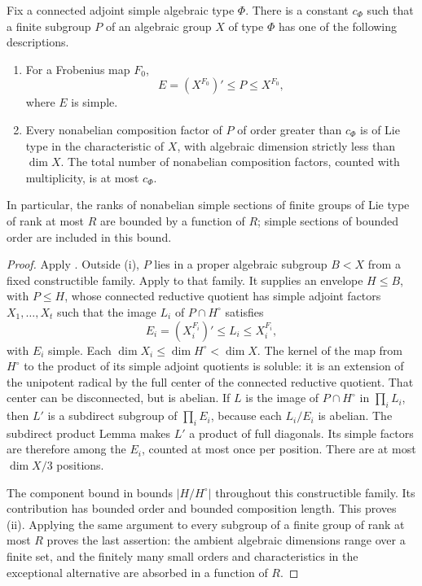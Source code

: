 \begin{lemma}\label{cls:envelopes}
Fix a connected adjoint simple algebraic type $\Phi$.  There is a
constant $c_\Phi$ such that a finite subgroup $P$ of an algebraic
group $X$ of type $\Phi$ has one of the following descriptions.
\begin{enumerate}[label=\textup{(\roman*)}]
\item For a Frobenius map $F_0$,
\[
 E=(X^{F_0})'\leq P\leq X^{F_0},
\]
where $E$ is simple.
\item Every nonabelian composition factor of $P$ of order greater
than $c_\Phi$ is of Lie type in the characteristic of $X$, with
algebraic dimension strictly less than $\dim X$.  The total number
of nonabelian composition factors, counted with multiplicity, is at
most $c_\Phi$.
\end{enumerate}
In particular, the ranks of nonabelian simple sections of finite
groups of Lie type of rank at most $R$ are bounded by a function of
$R$; simple sections of bounded order are included in this bound.
\end{lemma}
\begin{proof}
Apply \cite[Theorem~0.5]{LarsenPink2011}.  Outside (i), $P$ lies in
a proper algebraic subgroup $B<X$ from a fixed constructible family.
Apply \cite[Theorem~12.3]{LarsenPink2011} to that family.  It supplies
an envelope $H\leq B$, with $P\leq H$, whose connected reductive
quotient has simple adjoint factors $X_1,\ldots,X_t$ such that the
image $L_i$ of $P\cap H^\circ$ satisfies
\[
 E_i=(X_i^{F_i})'\leq L_i\leq X_i^{F_i},
\]
with $E_i$ simple.  Each $\dim X_i\leq\dim H^\circ<\dim X$.
The kernel of the map from $H^\circ$ to the product of its simple
adjoint quotients is soluble: it is an extension of the unipotent
radical by the full center of the connected reductive quotient.
That center can be disconnected, but is abelian.  If $L$ is the image of $P\cap H^\circ$
in $\prod_i L_i$, then $L'$ is a subdirect subgroup of
$\prod_iE_i$, because each $L_i/E_i$ is abelian.  The subdirect
product Lemma makes $L'$ a product of full diagonals.  Its simple
factors are therefore among the $E_i$, counted at most once per
position.  There are at most $\dim X/3$ positions.

The component bound in \cite[Proposition~1.4]{LarsenPink2011} bounds
$|H/H^\circ|$ throughout this constructible family.  Its contribution
has bounded order and bounded composition length.  This proves (ii).
Applying the same argument to every subgroup of a finite group of
rank at most $R$ proves the last assertion: the ambient algebraic
dimensions range over a finite set, and the finitely many small
orders and characteristics in the exceptional alternative are
absorbed in a function of $R$.
\end{proof}

